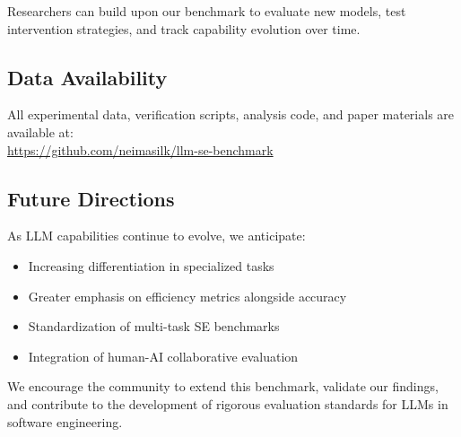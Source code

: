 Researchers can build upon our benchmark to evaluate new models, test intervention strategies, and track capability evolution over time.

\subsection{Data Availability}

All experimental data, verification scripts, analysis code, and paper materials are available at:\\
\url{https://github.com/neimasilk/llm-se-benchmark}

\subsection{Future Directions}

As LLM capabilities continue to evolve, we anticipate:
\begin{itemize}
    \item Increasing differentiation in specialized tasks
    \item Greater emphasis on efficiency metrics alongside accuracy
    \item Standardization of multi-task SE benchmarks
    \item Integration of human-AI collaborative evaluation
\end{itemize}

We encourage the community to extend this benchmark, validate our findings, and contribute to the development of rigorous evaluation standards for LLMs in software engineering.
